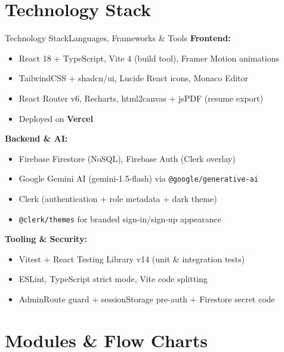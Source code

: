 \documentclass{beamer}
\begin{document}
\section{Technology Stack}
\begin{frame}{Technology Stack}{Languages, Frameworks \& Tools}
\textbf{Frontend:}
\begin{itemize}
    \item React 18 + TypeScript, Vite 4 (build tool), Framer Motion animations
    \item TailwindCSS + shadcn/ui, Lucide React icons, Monaco Editor
    \item React Router v6, Recharts, html2canvas + jsPDF (resume export)
    \item Deployed on \textbf{Vercel}
\end{itemize}

\vspace{3pt}

\textbf{Backend \& AI:}
\begin{itemize}
    \item Firebase Firestore (NoSQL), Firebase Auth (Clerk overlay)
    \item Google Gemini AI (gemini-1.5-flash) via \texttt{@google/generative-ai}
    \item Clerk (authentication + role metadata + dark theme)
    \item \texttt{@clerk/themes} for branded sign-in/sign-up appearance
\end{itemize}

\vspace{3pt}

\textbf{Tooling \& Security:}
\begin{itemize}
    \item Vitest + React Testing Library v14 (unit \& integration tests)
    \item ESLint, TypeScript strict mode, Vite code splitting
    \item AdminRoute guard + sessionStorage pre-auth + Firestore secret code
\end{itemize}
\end{frame}

\section{Modules \& Flow Charts}
\end{document}
